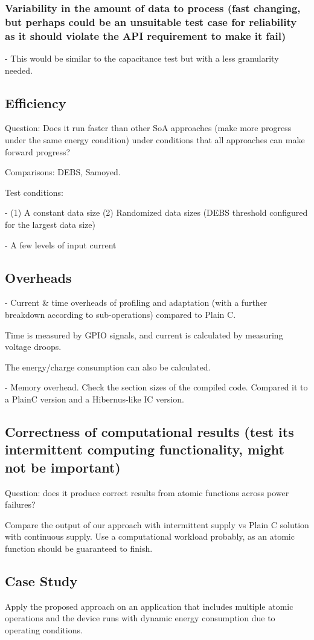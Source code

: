 \subsubsection{Variability in the amount of data to process (fast changing, but perhaps could be an unsuitable test case for reliability as it should violate the API requirement to make it fail)}
    
- This would be similar to the capacitance test but with a less granularity needed.


\subsection{Efficiency}

Question: Does it run faster than other SoA approaches (make more progress under the same energy condition) under conditions that all approaches can make forward progress?

Comparisons: DEBS, Samoyed.

Test conditions:
    
- (1) A constant data size (2) Randomized data sizes (DEBS threshold configured for the largest data size)

- A few levels of input current

\subsection{Overheads}

- Current \& time overheads of profiling and adaptation (with a further breakdown according to sub-operations) compared to Plain C. 

Time is measured by GPIO signals, and current is calculated by measuring voltage droops. 

The energy/charge consumption can also be calculated. 

- Memory overhead. Check the section sizes of the compiled code. Compared it to a PlainC version and a Hibernus-like IC version.  

\subsection{Correctness of computational results (test its intermittent computing functionality, might not be important)}

Question: does it produce correct results from atomic functions across power failures?

Compare the output of our approach with intermittent supply vs Plain C solution with continuous supply. Use a computational workload probably, as an atomic function should be guaranteed to finish. 


\subsection{Case Study}

Apply the proposed approach on an application that includes multiple atomic operations and the device runs with dynamic energy consumption due to operating conditions. 
